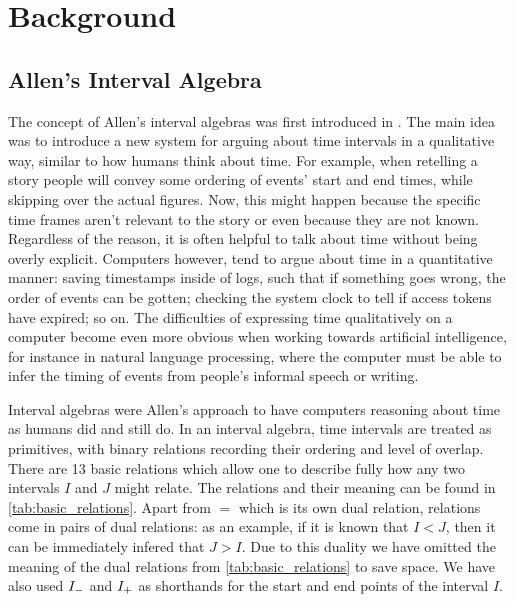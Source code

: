 \section{Background}%
\label{sec:background}

\subsection{Allen's Interval Algebra}%
\label{sub:allen_interval_algebras}

The concept of Allen's interval algebras was first introduced in \cite{allen83}. The main
idea was to introduce a new system for arguing about time intervals in a qualitative way, similar
to how humans think about time. For example, when retelling a story
people will convey some ordering of events' start and end times, while skipping over the actual
figures. Now, this might happen because the specific time frames aren't relevant to the story
or even because they are not known. Regardless of the reason, it is often helpful to talk 
about time without being overly explicit. Computers however, tend to argue about time in a
quantitative manner: saving timestamps inside of logs, such that if something goes wrong, the
order of events can be gotten; checking the system clock to tell if access tokens have expired;
so on. The difficulties of expressing time qualitatively on a computer become even more obvious
when working towards artificial intelligence, for instance in natural language processing,
where the computer must be able to infer the timing of events from people's informal speech or
writing.

Interval algebras were Allen's approach to have computers reasoning about time as humans did and
still do. In an interval algebra, time intervals are treated as primitives, with binary relations
recording their ordering and level of overlap. There are 13 basic
relations which allow one to describe fully how any two intervals $I$ and $J$ might relate. The
relations and their meaning can be found in \cref{tab:basic_relations}. Apart from $=$ which is
its own dual relation, relations come in pairs of dual relations: as an example, if it is known
that $I < J$, then it can be immediately infered that $J > I$. Due to this
duality we have omitted the meaning of the dual relations from \cref{tab:basic_relations} to save
space. We have also used $I_{-}$ and $I_{+}$ as shorthands for the
start and end points of the interval $I$.

